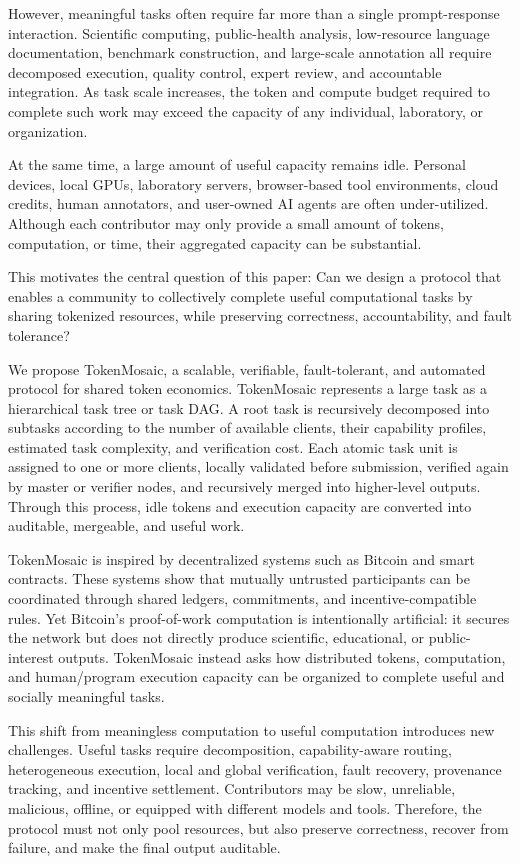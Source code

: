 \documentclass{article}
\theoremstyle{plain}
\begin{document}
However, meaningful tasks often require far more than a single prompt-response interaction. Scientific computing, public-health analysis, low-resource language documentation, benchmark construction, and large-scale annotation all require decomposed execution, quality control, expert review, and accountable integration. As task scale increases, the token and compute budget required to complete such work may exceed the capacity of any individual, laboratory, or organization.

At the same time, a large amount of useful capacity remains idle. Personal devices, local GPUs, laboratory servers, browser-based tool environments, cloud credits, human annotators, and user-owned AI agents are often under-utilized. Although each contributor may only provide a small amount of tokens, computation, or time, their aggregated capacity can be substantial.

This motivates the central question of this paper: Can we design a protocol that enables a community to collectively complete useful computational tasks by sharing tokenized resources, while preserving correctness, accountability, and fault tolerance?

We propose TokenMosaic, a scalable, verifiable, fault-tolerant, and automated protocol for shared token economics. TokenMosaic represents a large task as a hierarchical task tree or task DAG. A root task is recursively decomposed into subtasks according to the number of available clients, their capability profiles, estimated task complexity, and verification cost. Each atomic task unit is assigned to one or more clients, locally validated before submission, verified again by master or verifier nodes, and recursively merged into higher-level outputs. Through this process, idle tokens and execution capacity are converted into auditable, mergeable, and useful work.

TokenMosaic is inspired by decentralized systems such as Bitcoin and smart contracts. These systems show that mutually untrusted participants can be coordinated through shared ledgers, commitments, and incentive-compatible rules. Yet Bitcoin’s proof-of-work computation is intentionally artificial: it secures the network but does not directly produce scientific, educational, or public-interest outputs. TokenMosaic instead asks how distributed tokens, computation, and human/program execution capacity can be organized to complete useful and socially meaningful tasks.

This shift from meaningless computation to useful computation introduces new challenges. Useful tasks require decomposition, capability-aware routing, heterogeneous execution, local and global verification, fault recovery, provenance tracking, and incentive settlement. Contributors may be slow, unreliable, malicious, offline, or equipped with different models and tools. Therefore, the protocol must not only pool resources, but also preserve correctness, recover from failure, and make the final output auditable.
\end{document}
